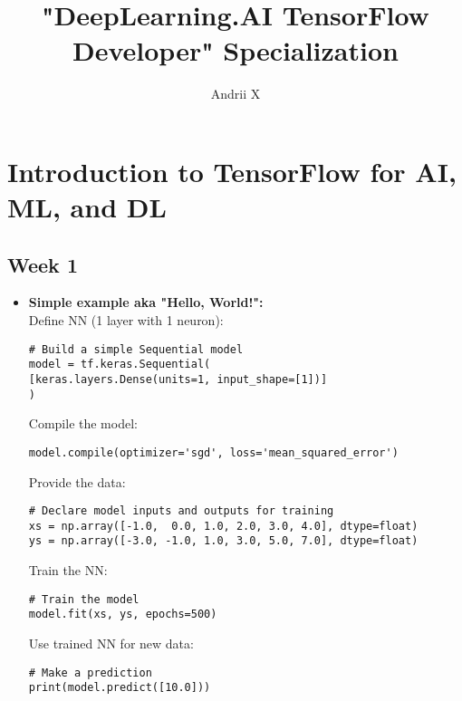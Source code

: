 \documentclass[20pt]{article}
\title{"DeepLearning.AI TensorFlow Developer" Specialization }
\author{ Andrii X }
\date{}
\begin{document}
	\maketitle
	
	\section{Introduction to TensorFlow for AI, ML, and DL}
	\subsection{Week 1}
	\begin{itemize}
		
		\item \textbf{Simple example aka "Hello, World!":}
		\\
		Define NN (1 layer with 1 neuron):
		\begin{verbatim}
# Build a simple Sequential model
model = tf.keras.Sequential(
[keras.layers.Dense(units=1, input_shape=[1])]
)
		\end{verbatim}
		Compile the model:
		\begin{verbatim}
model.compile(optimizer='sgd', loss='mean_squared_error')
		\end{verbatim}
		Provide the data:
		\begin{verbatim}
# Declare model inputs and outputs for training
xs = np.array([-1.0,  0.0, 1.0, 2.0, 3.0, 4.0], dtype=float)
ys = np.array([-3.0, -1.0, 1.0, 3.0, 5.0, 7.0], dtype=float)	
		\end{verbatim}
		Train the NN:
		\begin{verbatim}
# Train the model
model.fit(xs, ys, epochs=500)	
		\end{verbatim}
		Use trained NN for new data:
		\begin{verbatim}
# Make a prediction
print(model.predict([10.0]))	
		\end{verbatim}
	\end{itemize}
\end{document}
